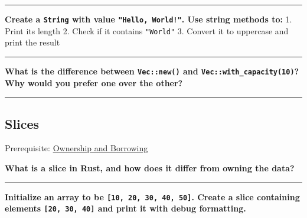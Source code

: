 \documentclass[
  11pt,
]{article}
\newenvironment{Shaded}{}{}
\begin{document}
\begin{Shaded}
\begin{Highlighting}[]

\end{Highlighting}
\end{Shaded}

\begin{center}\rule{0.5\linewidth}{0.5pt}\end{center}

\textbf{Create a \texttt{String} with value \texttt{"Hello,\ World!"}.
Use string methods to:} 1. Print its length 2. Check if it contains
\texttt{"World"} 3. Convert it to uppercase and print the result

\begin{Shaded}
\begin{Highlighting}[]

\end{Highlighting}
\end{Shaded}

\begin{center}\rule{0.5\linewidth}{0.5pt}\end{center}

\textbf{What is the difference between \texttt{Vec::new()} and
\texttt{Vec::with\_capacity(10)}? Why would you prefer one over the
other?}

\begin{center}\rule{0.5\linewidth}{0.5pt}\end{center}

\subsection{Slices}\label{slices}

Prerequisite: \hyperref[ownership-and-borrowing]{Ownership and
Borrowing}

\textbf{What is a slice in Rust, and how does it differ from owning the
data?}

\begin{center}\rule{0.5\linewidth}{0.5pt}\end{center}

\textbf{Initialize an array to be \texttt{{[}10,\ 20,\ 30,\ 40,\ 50{]}}.
Create a slice containing elements \texttt{{[}20,\ 30,\ 40{]}} and print
it with debug formatting.}

\begin{Shaded}
\begin{Highlighting}[]

\end{Highlighting}
\end{Shaded}
\end{document}
